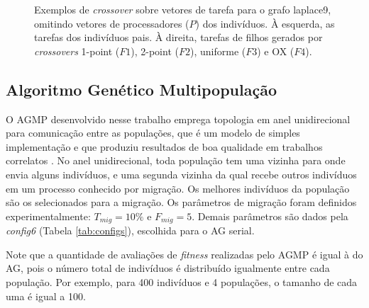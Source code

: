 \documentclass[fleqn,10pt]{SelfArx} %
\begin{document}
\begin{figure}
  \centering
   \hspace{0.1\textwidth}
  \caption{ Exemplos de \textit{crossover} sobre vetores de tarefa para o grafo laplace9, omitindo vetores de processadores ($P$) dos indivíduos. À esquerda, as tarefas dos indivíduos pais. À direita, tarefas de filhos gerados por \textit{crossovers} 1-point ($F1$), 2-point ($F2$), uniforme ($F3$) e OX ($F4$). }
  \label{fig:cross}
\end{figure}


\subsection{Algoritmo Genético Multipopulação}

O AGMP desenvolvido nesse trabalho emprega topologia em anel unidirecional para comunicação entre as populações, que é um modelo de simples implementação e que produziu resultados de boa qualidade em trabalhos correlatos \cite{cantu1998survey}. No anel unidirecional, toda população tem uma vizinha para onde envia alguns indivíduos, e uma segunda vizinha da qual recebe outros indivíduos em um processo conhecido por migração. Os melhores indivíduos da população são os selecionados para a migração. Os parâmetros de migração foram definidos experimentalmente: \(T_{mig} = 10\%\) e \(F_{mig} = 5\). Demais parâmetros são dados pela \textit{config6} (Tabela \ref{tab:configs}), escolhida para o AG serial.

Note que a quantidade de avaliações de \textit{fitness} realizadas pelo AGMP é igual à do AG, pois o número total de indivíduos é distribuído igualmente entre cada população. Por exemplo, para 400 indivíduos e 4 populações, o tamanho de cada uma é igual a 100.
\end{document}
